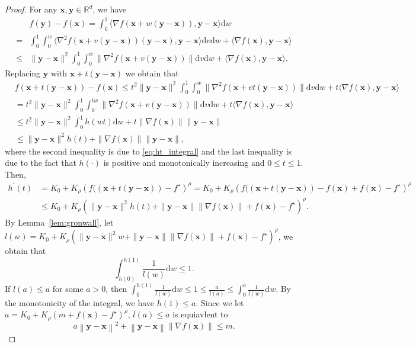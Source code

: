 \documentclass{article}
\newcommand{\Norm}[1]{\left\|#1\right\|}
\newcommand{\Kr}{K_{\rho}}
\newcommand{\paren}[1]{\left( #1 \right)}
\newcommand{\bx}{\mathbf{x}}
\newcommand{\by}{\mathbf{y}}
\newcommand{\RR}{\mathbb{R}}
\begin{document}
\begin{proof}
    For any $\bx,\by\in\RR^{d}$, we have
\begin{equation}\nonumber
    \begin{aligned}
        &f(\by)-f(\bx)=\int_0^1\langle\nabla f\left(\bx+w(\by-\bx)\right),\by-\bx\rangle \mathrm{d}w\\
        =&\int_0^1\int_0^w \langle \nabla^2 f(\bx+v(\by-\bx))(\by-\bx),\by-\bx\rangle \mathrm{d}v\mathrm{d}w + \langle\nabla f(\bx),\by-\bx\rangle\\
        \leq & \|\by-\bx\|^2\int_0^1\int_0^w  \|\nabla^2 f(\bx+v(\by-\bx))\|\mathrm{d}v\mathrm{d}w + \langle \nabla f(\bx), \by-\bx\rangle.
    \end{aligned}    
\end{equation}
    Replacing $\by$ with $\bx+t(\by-\bx)$ we obtain that
    \begin{equation}\nonumber
        \begin{aligned}
            &f\left(\bx+t(\by-\bx)\right)-f(\bx)\leq t^2\|\by-\bx\|^2\int_0^1\int_0^w\|\nabla^2 f\left(\bx+vt(\by-\bx)\right)\|\mathrm{d}v\mathrm{d}w+t\langle\nabla f(\bx),\by-\bx\rangle\\
            &= t^2\|\by-\bx\|^2\int_0^1\int_0^{tw}\|\nabla^2 f\left(\bx+v(\by-\bx)\right)\|\mathrm{d}v\mathrm{d}w+t\langle\nabla f(\bx),\by-\bx\rangle\\
            &\leq t^2\|\by-\bx\|^2\int_0^1 h(wt)\mathrm{d}w + t\|\nabla f(\bx)\|\|\by-\bx\|\\
            &\leq \|\by-\bx\|^2 h(t) + \|\nabla f(\bx)\|\|\by-\bx\|,
        \end{aligned}
    \end{equation}
    where the second inequality is due to \eqref{eq:ht_integral} and the last inequality is due to the fact that $h(\cdot)$ is positive and monotonically increasing and $0\leq t \leq 1$.
    Then,
    \begin{equation}\nonumber
        \begin{aligned}
            h^\prime(t)&=K_0+\Kr\left(f(\left(\bx+t\left(\by-\bx\right)\right)-f^\star\right)^\rho=K_0+\Kr\left(f(\left(\bx+t\left(\by-\bx\right)\right)-f(\bx)+f(\bx)-f^\star\right)^\rho\\
            &\leq K_0+\Kr \left(\|\by-\bx\|^2h(t)+\|\by-\bx\|\|\nabla f(\bx)\|+f(\bx)-f^\star\right)^\rho.
        \end{aligned}
    \end{equation}
    By Lemma~\ref{lem:gronwall}, let $l(w)=K_0+\Kr\left(\|\by-\bx\|^2w+\|\by-\bx\|\|\nabla f(\bx)\|+f(\bx)-f^\star\right)^\rho$, we obtain that
    $$\int_{h(0)}^{h(1)}\frac{1}{l(w)}\mathrm{d}w\leq 1.$$
    If $l(a)\leq a$ for some $a>0$, then $\int_0^{h(1)}\frac{1}{l(w)}\mathrm{d}w\leq 1\leq \frac{a}{l(a)}\leq\int_0^a\frac{1}{l(w)}\mathrm{d}w$. By the monotonicity of the integral, we have $h(1)\leq a$.
    Since we let $a=K_0+\Kr\paren{m+f(\bx)-f^\star}^\rho$, $l(a)\leq a$ is equiavlent to
    $$a\Norm{\by-\bx}^2+\Norm{\by-\bx}\Norm{\nabla f(\bx)}\leq m.$$
\end{proof}
\end{document}
